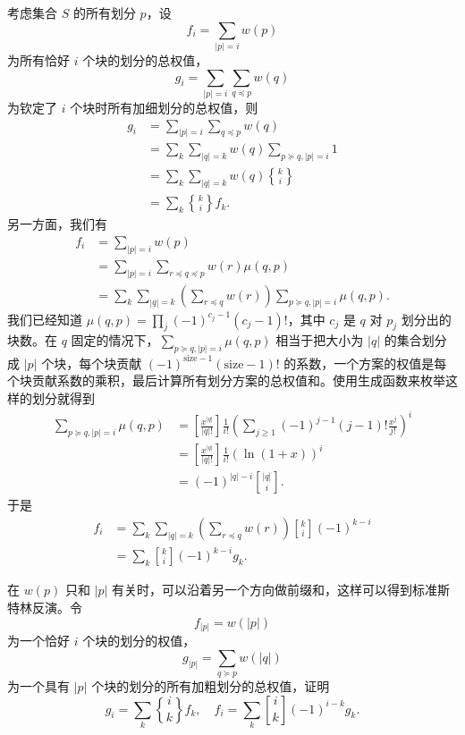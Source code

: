 \begin{corollary}[转置斯特林反演]
    考虑集合 $S$ 的所有划分 $p$，设
    $$
    f_i=\sum_{|p|=i}w(p)
    $$
    为所有恰好 $i$ 个块的划分的总权值，
    $$
    g_i=\sum_{|p|=i} \sum_{q\preceq p}w(q)
    $$
    为钦定了 $i$ 个块时所有加细划分的总权值，则
    $$
    \begin{aligned}
    g_i&=\sum_{|p|=i} \sum_{q\preceq p}w(q)\\
    &=\sum_{k}\sum_{|q|=k}w(q)\sum_{p\succeq q,|p|=i} 1\\
    &=\sum_k \sum_{|q|=k}w(q){k\brace i}\\
    &=\sum_k {k\brace i}f_k.
    \end{aligned}
    $$
    另一方面，我们有
    $$
    \begin{aligned}
        f_i&=\sum_{|p|=i}w(p)\\
        &=\sum_{|p|=i}\sum_{r\preceq q\preceq p}w(r)\mu(q,p)\\
        &=\sum_{k}\sum_{|q|=k}\left(\sum_{r\preceq q}w(r)\right)\sum_{p\succeq q,|p|=i}\mu(q,p).
    \end{aligned}
    $$
    我们已经知道 $\mu(q,p)=\prod_j (-1)^{c_j-1}(c_j-1)!$，其中 $c_j$ 是 $q$ 对 $p_j$ 划分出的块数。在 $q$ 固定的情况下，$\sum_{p\succeq q,|p|=i}\mu(q,p)$ 相当于把大小为 $|q|$ 的集合划分成 $|p|$ 个块，每个块贡献 $(-1)^{\mathrm{size}-1}(\mathrm{size}-1)!$ 的系数，一个方案的权值是每个块贡献系数的乘积，最后计算所有划分方案的总权值和。使用生成函数来枚举这样的划分就得到
    $$
    \begin{aligned}
        \sum_{p\succeq q,|p|=i}\mu(q,p)&=\left[\frac{x^{|q|}}{|q|!}\right]\frac{1}{i!}\left(\sum_{j\ge 1}(-1)^{j-1}(j-1)!\frac{x^j}{j!}\right)^i\\
        &=\left[\frac{x^{|q|}}{|q|!}\right]\frac{1}{i!}\left(\ln(1+x)\right)^i\\
        &=(-1)^{|q|-i}{|q|\brack i}.
    \end{aligned}
    $$
    于是
    $$
    \begin{aligned}
        f_i&=\sum_k\sum_{|q|=k}\left(\sum_{r\preceq q}w(r)\right){k\brack i}(-1)^{k-i}\\
        &=\sum_k {k\brack i}(-1)^{k-i}g_k.
    \end{aligned}
    $$
\end{corollary}
\begin{exercise}[标准斯特林反演]
    在 $w(p)$ 只和 $|p|$ 有关时，可以沿着另一个方向做前缀和，这样可以得到标准斯特林反演。令
    $$
    f_{|p|}=w(|p|)
    $$
    为一个恰好 $i$ 个块的划分的权值，
    $$
    g_{|p|}=\sum_{q\succeq p}w(|q|)
    $$
    为一个具有 $|p|$ 个块的划分的所有加粗划分的总权值，证明
    $$
    g_i=\sum_k {i\brace k}f_k,\quad f_i=\sum_k {i\brack k}(-1)^{i-k}g_k.
    $$
\end{exercise}

